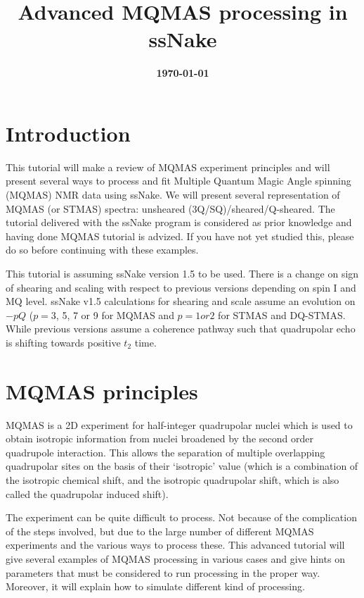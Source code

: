 \documentclass[11pt,a4paper]{article}
\title{\color{black}\fontfamily{SourceSansPro-LF}\bfseries Advanced MQMAS processing in ssNake}
\author{}
\date{\color{black}\fontfamily{SourceSansPro-LF}\bfseries \today}
\begin{document}

\maketitle

\section{Introduction}
This tutorial will make a review of MQMAS experiment principles and will present several ways to process and fit 
Multiple Quantum Magic Angle spinning (MQMAS) NMR data using ssNake.
We will present several representation of MQMAS (or STMAS) spectra: unsheared (3Q/SQ)/sheared/Q-sheared.
The tutorial delivered with the ssNake program is considered as prior knowledge and having done MQMAS tutorial is advized.
If you have not yet studied this, please do so before continuing with these examples.

This tutorial is assuming ssNake version 1.5 to be used. There is a change on sign of shearing and scaling with respect to 
previous versions depending on spin I and MQ level. ssNake v1.5 calculations for shearing and scale assume an evolution on 
$-pQ$ ($p=$3, 5, 7 or 9 for MQMAS and $p= 1 or 2$ for STMAS and DQ-STMAS. While previous versions assume a coherence pathway 
such that quadrupolar echo is shifting towards positive $t_2$ time.

\section{MQMAS principles}
MQMAS is a 2D experiment for half-integer quadrupolar nuclei which is used to obtain isotropic information from nuclei 
broadened by the second order quadrupole interaction. This allows the separation of multiple overlapping quadrupolar 
sites on the basis of their `isotropic' value (which is a combination of the isotropic chemical shift, and the isotropic 
quadrupolar shift, which is also called the quadrupolar induced shift). 

The experiment can be quite difficult to process.
Not because of the complication of the steps involved, but due to the large number of different MQMAS experiments and the various ways to process these.
This advanced tutorial will give several examples of MQMAS processing in various cases and give hints on parameters that must be
considered to run processing in the proper way.
Moreover, it will explain how to simulate different kind of processing.
\end{document}
